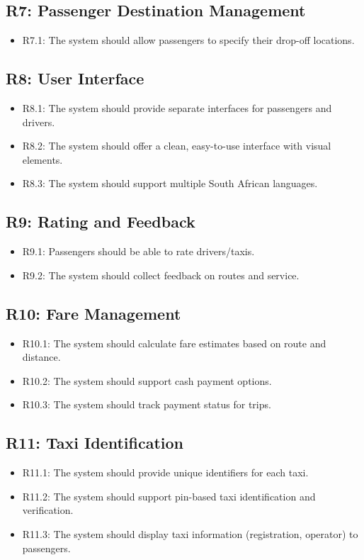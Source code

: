 \documentclass[a4paper,12pt]{article}
\begin{document}
\subsection*{R7: Passenger Destination Management}
\begin{itemize}
    \item R7.1: The system should allow passengers to specify their drop-off locations.
\end{itemize}

\subsection*{R8: User Interface}
\begin{itemize}
    \item R8.1: The system should provide separate interfaces for passengers and drivers.
    \item R8.2: The system should offer a clean, easy-to-use interface with visual elements.
    \item R8.3: The system should support multiple South African languages. 
\end{itemize}

\subsection*{R9: Rating and Feedback}
\begin{itemize}
    \item R9.1: Passengers should be able to rate drivers/taxis.
    \item R9.2: The system should collect feedback on routes and service.
\end{itemize}

\subsection*{R10: Fare Management}
\begin{itemize}
    \item R10.1: The system should calculate fare estimates based on route and distance.
    \item R10.2: The system should support cash payment options.
    \item R10.3: The system should track payment status for trips.
\end{itemize}

\subsection*{R11: Taxi Identification}
\begin{itemize}
    \item R11.1: The system should provide unique identifiers for each taxi.
    \item R11.2: The system should support  pin-based taxi identification and verification.
    \item R11.3: The system should display taxi information (registration, operator) to passengers.
\end{itemize}
\end{document}
